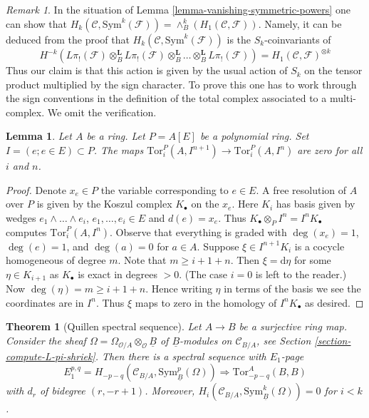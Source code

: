 \documentclass[10pt,a4paper]{article}
\theoremstyle{plain}
\newtheorem{theorem}[subsection]{Theorem}
\newtheorem{lemma}[subsection]{Lemma}
\theoremstyle{definition}
\theoremstyle{remark}
\newtheorem{remark}[subsection]{Remark}
\numberwithin{equation}{subsection}
\begin{document}
\begin{remark}
\label{remark-first-homology-symmetric-power}
In the situation of Lemma \ref{lemma-vanishing-symmetric-powers}
one can show that
$H_k(\mathcal{C}, \text{Sym}^k(\mathcal{F})) =
\wedge^k_B(H_1(\mathcal{C}, \mathcal{F}))$.
Namely, it can be deduced from the proof that
$H_k(\mathcal{C}, \text{Sym}^k(\mathcal{F}))$ is the $S_k$-coinvariants
of
$$
H^{-k}(L\pi_!(\mathcal{F}) \otimes_B^\mathbf{L}
L\pi_!(\mathcal{F}) \otimes_B^\mathbf{L}
\ldots \otimes_B^\mathbf{L} L\pi_!(\mathcal{F})) =
H_1(\mathcal{C}, \mathcal{F})^{\otimes k}
$$
Thus our claim is that this action is given by the usual action
of $S_k$ on the tensor product multiplied by the sign character.
To prove this one has to work through the sign conventions
in the definition of the total complex associated to a
multi-complex. We omit the verification.
\end{remark}

\begin{lemma}
\label{lemma-map-tors-zero}
Let $A$ be a ring. Let $P = A[E]$ be a polynomial ring.
Set $I = (e; e \in E) \subset P$. The maps
$\text{Tor}_i^P(A, I^{n + 1}) \to \text{Tor}_i^P(A, I^n)$
are zero for all $i$ and $n$.
\end{lemma}

\begin{proof}
Denote $x_e \in P$ the variable corresponding to $e \in E$.
A free resolution of $A$ over $P$ is given by the Koszul complex
$K_\bullet$ on the $x_e$. Here $K_i$ has basis given by wedges
$e_1 \wedge \ldots \wedge e_i$, $e_1, \ldots, e_i \in E$ and $d(e) = x_e$.
Thus $K_\bullet \otimes_P I^n = I^nK_\bullet$ computes
$\text{Tor}_i^P(A, I^n)$. Observe that everything is graded
with $\deg(x_e) = 1$, $\deg(e) = 1$, and $\deg(a) = 0$ for $a \in A$.
Suppose $\xi \in I^{n + 1}K_i$ is a cocycle homogeneous of degree $m$.
Note that $m \geq i + 1 + n$. Then $\xi = \text{d}\eta$ for some
$\eta \in K_{i + 1}$ as $K_\bullet$ is exact in degrees $ > 0$.
(The case $i = 0$ is left to the reader.)
Now $\deg(\eta) = m \geq i + 1 + n$. Hence writing $\eta$
in terms of the basis we see the coordinates are in $I^n$.
Thus $\xi$ maps to zero in the homology of $I^nK_\bullet$ as desired.
\end{proof}


\begin{theorem}[Quillen spectral sequence]
\label{theorem-quillen-spectral-sequence}
Let $A \to B$ be a surjective ring map. Consider the sheaf
$\Omega = \Omega_{\mathcal{O}/A} \otimes_\mathcal{O} \underline{B}$ of
$\underline{B}$-modules on $\mathcal{C}_{B/A}$, see
Section \ref{section-compute-L-pi-shriek}.
Then there is a spectral sequence with $E_1$-page
$$
E_1^{p, q} =
H_{- p - q}(\mathcal{C}_{B/A}, \text{Sym}^p_{\underline{B}}(\Omega))
\Rightarrow \text{Tor}^A_{- p - q}(B, B)
$$
with $d_r$ of bidegree $(r, -r + 1)$.
Moreover, $H_i(\mathcal{C}_{B/A}, \text{Sym}^k_{\underline{B}}(\Omega)) = 0$
for $i < k$.
\end{theorem}
\end{document}
